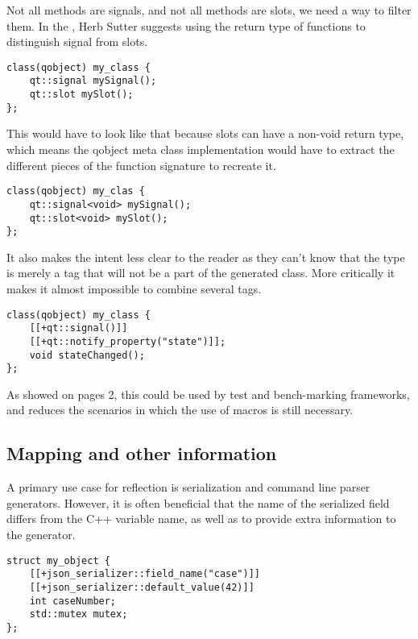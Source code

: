 \documentclass{wg21}
\begin{document}
Not all methods are signals, and not all methods are slots, we need a way to filter them.
In the \cite{P0707}, Herb Sutter suggests using the return type of functions to distinguish signal from slots.

\begin{verbatim}
class(qobject) my_class {
    qt::signal mySignal();
    qt::slot mySlot();
};
\end{verbatim}

This would have to look like that because slots can have a non-void return type, which means the qobject meta class implementation would have to extract the different pieces of the function signature to recreate it.

\begin{verbatim}
class(qobject) my_clas {
    qt::signal<void> mySignal();
    qt::slot<void> mySlot();
};
\end{verbatim}

It also makes the intent less clear to the reader as they can't know that the  type is merely a tag that will not be a part of the generated class.
More critically it makes it almost impossible to combine several tags.

\begin{verbatim}
class(qobject) my_class {
    [[+qt::signal()]]
    [[+qt::notify_property("state")]]; 
    void stateChanged();
};

\end{verbatim}

As showed on pages 2, this could be used by test and bench-marking frameworks, and reduces the scenarios in which the use of macros
is still necessary.


\subsection{Mapping and other information}

A primary use case for reflection is serialization and command line parser generators.
However, it is often beneficial that the name of the serialized field differs from the C++ variable name, as well as to provide extra information to the generator.

\begin{verbatim}
struct my_object {
    [[+json_serializer::field_name("case")]]
    [[+json_serializer::default_value(42)]]
    int caseNumber;
    std::mutex mutex;
};
\end{verbatim}
\end{document}
